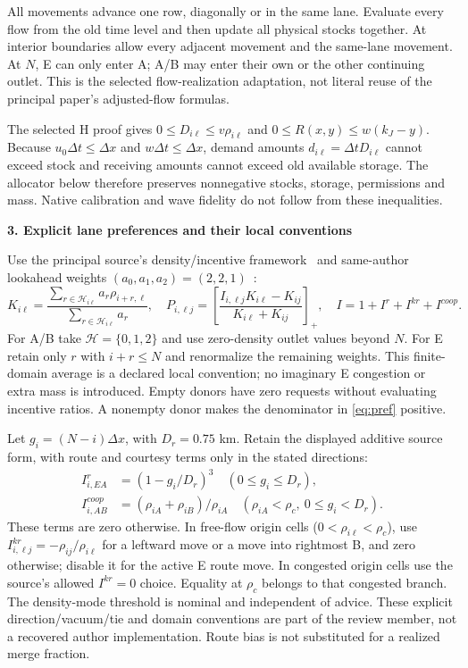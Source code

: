\documentclass[10pt,a4paper]{article}
\newcommand{\head}[1]{\par\medskip\textbf{#1}\par}
\newcommand{\pos}[1]{\left[#1\right]_+}
\begin{document}
All movements advance one row, diagonally or in the same lane. Evaluate
every flow from the old time level and then update all physical stocks
together. At interior boundaries allow every adjacent movement and the
same-lane movement. At $N$, E can only enter A; A/B may enter their own or
the other continuing outlet. This is the selected flow-realization adaptation,
not literal reuse of the principal paper's adjusted-flow formulas.

The selected H proof gives $0\leq D_{i\ell}\leq v\rho_{i\ell}$ and
$0\leq R(x,y)\leq w(k_J-y)$. Because $u_0\Delta t\leq\Delta x$ and
$w\Delta t\leq\Delta x$, demand amounts $d_{i\ell}=\Delta t D_{i\ell}$
cannot exceed stock and receiving amounts cannot exceed old available
storage. The allocator below therefore preserves nonnegative stocks,
storage, permissions and mass. Native calibration and wave fidelity do not
follow from these inequalities.

\newpage
\head{3. Explicit lane preferences and their local conventions}
Use the principal source's density/incentive framework~\cite{ns} and
same-author lookahead weights $(a_0,a_1,a_2)=(2,2,1)$~\cite{thesis}:
\begin{equation}
 K_{i\ell}=\frac{\sum_{r\in\mathcal H_{i\ell}}a_r\rho_{i+r,\ell}}
 {\sum_{r\in\mathcal H_{i\ell}}a_r},\quad
 P_{i,\ell j}=\pos{\frac{I_{i,\ell j}K_{i\ell}-K_{ij}}{K_{i\ell}+K_{ij}}},
 \quad I=1+I^r+I^{kr}+I^{coop}. \label{eq:pref}
\end{equation}
For A/B take $\mathcal H=\{0,1,2\}$ and use zero-density outlet values beyond
$N$. For E retain only $r$ with $i+r\leq N$ and renormalize the remaining
weights. This finite-domain average is a declared local convention; no
imaginary E congestion or extra mass is introduced. Empty donors have zero
requests without evaluating incentive ratios. A nonempty donor makes the
denominator in \eqref{eq:pref} positive.

Let $g_i=(N-i)\Delta x$, with $D_r=0.75$ km. Retain the displayed additive
source form, with route and courtesy terms only in the stated directions:
\begin{align}
 I^r_{i,EA}&=(1-g_i/D_r)^3\quad(0\leq g_i\leq D_r),\nonumber\\
 I^{coop}_{i,AB}&=(\rho_{iA}+\rho_{iB})/\rho_{iA}
 \quad(\rho_{iA}<\rho_c,\ 0\leq g_i<D_r). \label{eq:incentives}
\end{align}
These terms are zero otherwise. In free-flow origin cells
($0<\rho_{i\ell}<\rho_c$), use
$I^{kr}_{i,\ell j}=-\rho_{ij}/\rho_{i\ell}$ for a leftward move or a move
into rightmost B, and zero otherwise; disable it for the active E route move.
In congested origin cells use the source's allowed $I^{kr}=0$ choice. Equality
at $\rho_c$ belongs to that congested branch. The density-mode threshold is
nominal and independent of advice. These explicit direction/vacuum/tie and
domain conventions are part of the review member, not a recovered author
implementation. Route bias is not substituted for a realized merge fraction.
\end{document}
